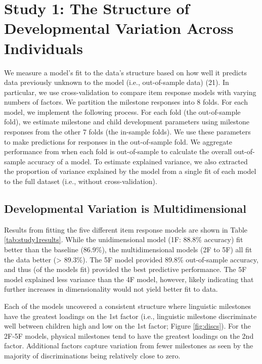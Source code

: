 \documentclass[man]{apa7}
\begin{document}
\hypertarget{study-1-the-structure-of-developmental-variation-across-individuals}{%
\section*{Study 1: The Structure of Developmental Variation Across
Individuals}\label{study-1-the-structure-of-developmental-variation-across-individuals}}

We measure a model's fit to the data's structure based
on how well it predicts data previously unknown to the model (i.e.,
out-of-sample data) (21). In particular, we use cross-validation to compare
item response models with varying numbers of factors. We
partition the milestone responses into 8 folds. For each model, we
implement the following process. For each fold (the out-of-sample
fold), we estimate milestone and child development parameters using
milestone responses from the other 7 folds (the in-sample folds).
We use these parameters to make predictions for responses in the
out-of-sample fold. We aggregate performance from when each fold is
out-of-sample to calculate the overall out-of-sample accuracy of a
model. To estimate explained variance, we also extracted the proportion of variance explained by the model from a single fit of each model
to the full dataset (i.e., without cross-validation).

\hypertarget{developmental-variation-is-multidimensional}{%
\subsection*{Developmental Variation is
Multidimensional}\label{developmental-variation-is-multidimensional}}

Results from fitting the five different item response models are shown
in Table \ref{tab:study1results}. While the unidimensional model (1F:
88.8\% accuracy) fit better than the baseline (86.9\%), the
multidimensional models (2F to 5F) all fit the data better
(\textgreater{} 89.3\%). The 5F model provided 89.8\% out-of-sample
accuracy, and thus (of the models fit) provided the best predictive
performance. The 5F model explained less variance than the 4F model, however,
likely indicating that further increases in dimensionality would not yield better fit to data. 

Each of the models uncovered a consistent structure where linguistic milestones have
the greatest loadings on the 1st factor (i.e., linguistic milestone
discriminate well between children high and low on the 1st factor; Figure \ref{fig:discs}). For the 2F-5F models, physical milestones tend to have the greatest loadings
on the 2nd factor. Additional factors capture variation from fewer
milestones as seen by the majority of discriminations being relatively close to zero.
\end{document}
